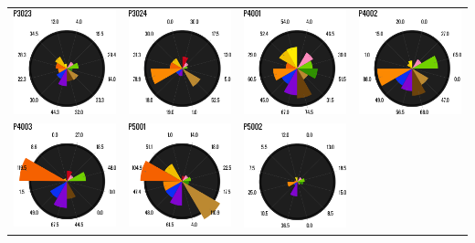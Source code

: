 \begin{table}[htbp]
\begin{tabular}{p{1.25in}p{1.25in}p{1.25in}p{1.25in}}
\includegraphics[width=1.25in]{./images/cont4/polar_charts/p3023}&
\includegraphics[width=1.25in]{./images/cont4/polar_charts/p3024}&
\includegraphics[width=1.25in]{./images/cont4/polar_charts/p4001}&
\includegraphics[width=1.25in]{./images/cont4/polar_charts/p4002}\\
\includegraphics[width=1.25in]{./images/cont4/polar_charts/p4003}&
\includegraphics[width=1.25in]{./images/cont4/polar_charts/p5001}&
\includegraphics[width=1.25in]{./images/cont4/polar_charts/p5002}&

\end{tabular}
\end{table}

